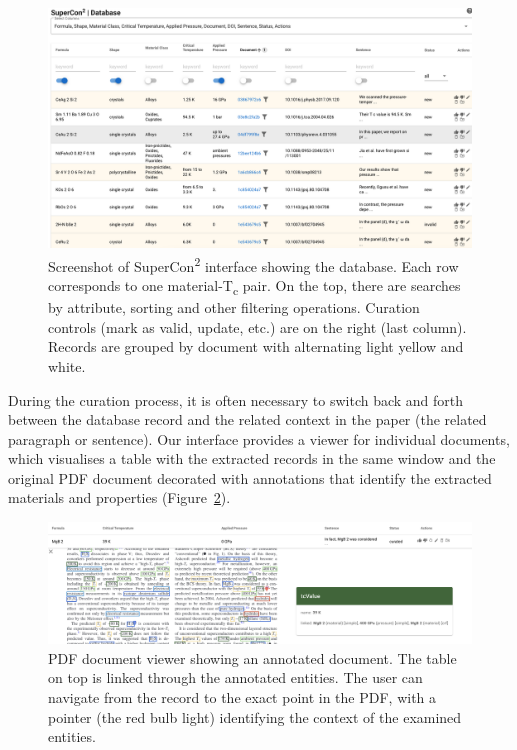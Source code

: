 \begin{figure}[htbp]
  \centering
  \includegraphics[width=1\textwidth]{figures/curation/supercon-curation-database.png} 
  \caption{Screenshot of SuperCon\textsuperscript{2} interface showing the database. Each row corresponds to one material-T\textsubscript{c} pair. On the top, there are searches by attribute, sorting and other filtering operations. Curation controls (mark as valid, update, etc.) are on the right (last column). Records are grouped by document with alternating light yellow and white. }
  \label{fig:curation-interface-database}
\end{figure}

During the curation process, it is often necessary to switch back and forth between the database record and the related context in the paper (the related paragraph or sentence). 
Our interface provides a viewer for individual documents, which visualises a table with the extracted records in the same window and the original PDF document decorated with annotations that identify the extracted materials and properties (Figure~\ref{fig:pdf-view}). 

\begin{figure}[htbp]
  \centering
  \includegraphics[width=1\textwidth]{figures/curation/pdf-view-context.png} 
  \caption{PDF document viewer showing an annotated document. The table on top is linked through the annotated entities. The user can navigate from the record to the exact point in the PDF, with a pointer (the red bulb light) identifying the context of the examined entities. }
  \label{fig:pdf-view}
\end{figure}

